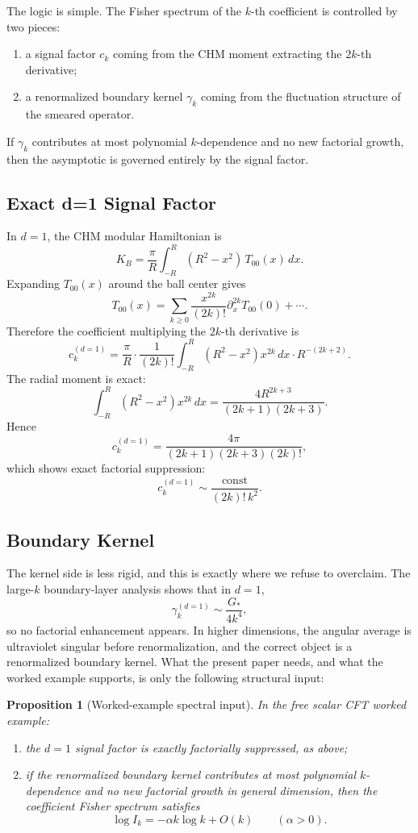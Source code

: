\documentclass[12pt]{article}
\newtheorem{proposition}[theorem]{Proposition}
\theoremstyle{definition}
\theoremstyle{remark}
\begin{document}
The logic is simple. The Fisher spectrum of the \(k\)-th coefficient is
controlled by two pieces:
\begin{enumerate}
\item a signal factor \(c_k\) coming from the CHM moment extracting the
\(2k\)-th derivative;
\item a renormalized boundary kernel \(\gamma_k\) coming from the
fluctuation structure of the smeared operator.
\end{enumerate}
If \(\gamma_k\) contributes at most polynomial \(k\)-dependence and no
new factorial growth, then the asymptotic is governed entirely by the
signal factor.

\subsection{Exact d=1 Signal Factor}\label{subsec:5.2}

In \(d=1\), the CHM modular Hamiltonian is
\[
K_B
=
\frac{\pi}{R}\int_{-R}^{R}(R^2-x^2)\,T_{00}(x)\,dx.
\]
Expanding \(T_{00}(x)\) around the ball center gives
\[
T_{00}(x)
=
\sum_{k\ge 0}\frac{x^{2k}}{(2k)!}\partial_x^{2k}T_{00}(0)+\cdots.
\]
Therefore the coefficient multiplying the \(2k\)-th derivative is
\[
c_k^{(d=1)}
=
\frac{\pi}{R}\cdot\frac{1}{(2k)!}
\int_{-R}^{R}(R^2-x^2)x^{2k}\,dx\cdot R^{-(2k+2)}.
\]
The radial moment is exact:
\[
\int_{-R}^{R}(R^2-x^2)x^{2k}\,dx
=
\frac{4R^{2k+3}}{(2k+1)(2k+3)}.
\]
Hence
\[
c_k^{(d=1)}
=
\frac{4\pi}{(2k+1)(2k+3)(2k)!},
\]
which shows exact factorial suppression:
\[
c_k^{(d=1)}
\sim
\frac{\mathrm{const}}{(2k)!\,k^2}.
\]

\subsection{Boundary Kernel}\label{subsec:5.3}

The kernel side is less rigid, and this is exactly where we refuse to
overclaim. The large-\(k\) boundary-layer analysis shows that in
\(d=1\),
\[
\gamma_k^{(d=1)}\sim \frac{G_*}{4k^4},
\]
so no factorial enhancement appears. In higher dimensions, the angular
average is ultraviolet singular before renormalization, and the correct
object is a renormalized boundary kernel. What the present paper needs,
and what the worked example supports, is only the following structural
input:

\begin{proposition}[Worked-example spectral input]\label{prop:5.1}
In the free scalar CFT worked example:
\begin{enumerate}
\item the \(d=1\) signal factor is exactly factorially suppressed, as
above;
\item if the renormalized boundary kernel contributes at most
polynomial \(k\)-dependence and no new factorial growth in general
dimension, then the coefficient Fisher spectrum satisfies
\[
\log I_k = -\alpha k\log k + O(k)
\qquad
(\alpha>0).
\]
\end{enumerate}
\end{proposition}
\end{document}
